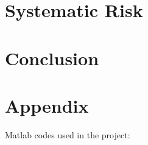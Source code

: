 \documentclass[a4paper, 11pt]{article}
\newcommand{\includecode}[1]{}
\begin{document}
\section{Systematic Risk}


\section{Conclusion}




%
%

\section{Appendix}
Matlab codes used in the project:
\end{document}
